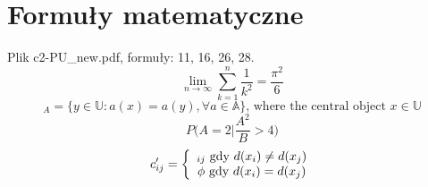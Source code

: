 \documentclass{article}
\begin{document}
\section{Formuły matematyczne}
	Plik c2-PU\_new.pdf, formuły: 11, 16, 26, 28.
	\newline
	\begin{equation}
		\lim_{n\to\infty}\sum_{k=1}^{n}\frac{1}{k^{2}}=\frac{\pi^{2}}{6} 
	\end{equation}
	\begin{equation}
		[x]_A =\{ y\in\mathbb{U}:a(x)=a(y),\forall a\in\mathbb{A} \} \text{, where the central object }x\in\mathbb{U}
	\end{equation}
		\begin{equation}
			P\bigg(A=2 \bigg|\frac{A^{2}}{B}>4\bigg)
	\end{equation}
\begin{equation}
			c^{\prime}_{ij} = 
			\left\{
				\begin{array}[c]
					c_{ij} \text{ gdy }d(x_i)\neq d(x_j)\\
					\phi \text{ gdy }d(x_i) = d(x_j) \\
				\end{array}
			\right.
	\end{equation}
\end{document}
